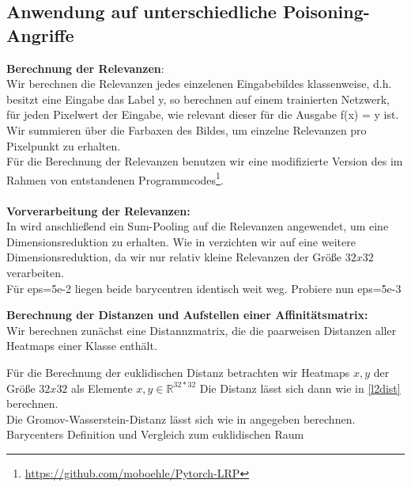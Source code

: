 \documentclass[11pt,a4paper]{article}
\numberwithin{equation}{section}
\begin{document}
	
	\subsection{Anwendung auf unterschiedliche Poisoning-Angriffe} \label{chapter_results} \label{chapter_experiments}
	\noindent \textbf{Berechnung der Relevanzen}:\\
	
	\noindent Wir berechnen die Relevanzen jedes einzelenen Eingabebildes klassenweise, d.h. besitzt eine Eingabe das Label y, so berechnen auf einem trainierten Netzwerk, für jeden Pixelwert der Eingabe, wie relevant dieser für die Ausgabe f(x) = y ist.\\
	Wir summieren über die Farbaxen des Bildes, um einzelne Relevanzen pro Pixelpunkt zu erhalten.\\
	Für die Berechnung der Relevanzen benutzen wir eine modifizierte Version des im Rahmen von \cite{lrp_alzheimer} entstandenen Programmcodes\footnote{\url{https://github.com/moboehle/Pytorch-LRP}}.\\
	\\
	\noindent \textbf{Vorverarbeitung der Relevanzen:}\\
	In \cite{unmaskingCH} wird anschließend ein Sum-Pooling auf die Relevanzen angewendet, um eine Dimensionsreduktion zu erhalten. Wie in \cite{imagenet_unhansed_v1} verzichten wir auf eine weitere Dimensionsreduktion, da wir nur relativ kleine Relevanzen der Größe $32x32$ verarbeiten.	\\
	
	Für eps=5e-2 liegen beide barycentren identisch weit weg. Probiere nun eps=5e-3
	
	\noindent \textbf{Berechnung der Distanzen und Aufstellen einer Affinitätsmatrix:}\\
	
	Wir berechnen zunächst eine Distannzmatrix, die die paarweisen Distanzen aller Heatmaps einer Klasse enthält.	
	
	Für die Berechnung der euklidischen Distanz betrachten wir Heatmaps $x,y$ der Größe $32x32$ als Elemente $x,y \in \mathbb{R}^{32*32}$ Die Distanz lässt sich dann wie in \autoref{l2dist} berechnen.\\
	
	Die Gromov-Wasserstein-Distanz lässt sich wie in \cite{gwd_averaging_kernels} angegeben berechnen. \\
	
	Barycenters Definition und Vergleich zum euklidischen Raum \cite{bary_wasserstein_space}
	
\end{document}
